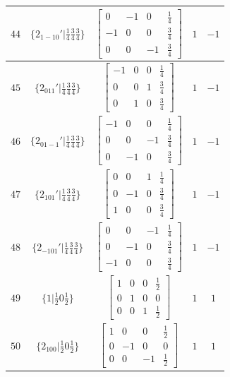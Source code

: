 \documentclass[fleqn,8pt]{jsarticle}
\begin{document}
\begin{longtable}{ccccc}
$ 44 $ & $ \{2{}_{1-10}{}'|\frac{1}{4} \frac{3}{4} \frac{3}{4}\} $ & $ \begin{bmatrix} 0 & -1 & 0 & \frac{1}{4} \\ -1 & 0 & 0 & \frac{3}{4} \\ 0 & 0 & -1 & \frac{3}{4} \end{bmatrix} $ & $ 1 $ & $ -1 $ \\ \hline
$ 45 $ & $ \{2{}_{011}{}'|\frac{1}{4} \frac{3}{4} \frac{3}{4}\} $ & $ \begin{bmatrix} -1 & 0 & 0 & \frac{1}{4} \\ 0 & 0 & 1 & \frac{3}{4} \\ 0 & 1 & 0 & \frac{3}{4} \end{bmatrix} $ & $ 1 $ & $ -1 $ \\ \hline
$ 46 $ & $ \{2{}_{01-1}{}'|\frac{1}{4} \frac{3}{4} \frac{3}{4}\} $ & $ \begin{bmatrix} -1 & 0 & 0 & \frac{1}{4} \\ 0 & 0 & -1 & \frac{3}{4} \\ 0 & -1 & 0 & \frac{3}{4} \end{bmatrix} $ & $ 1 $ & $ -1 $ \\ \hline
$ 47 $ & $ \{2{}_{101}{}'|\frac{1}{4} \frac{3}{4} \frac{3}{4}\} $ & $ \begin{bmatrix} 0 & 0 & 1 & \frac{1}{4} \\ 0 & -1 & 0 & \frac{3}{4} \\ 1 & 0 & 0 & \frac{3}{4} \end{bmatrix} $ & $ 1 $ & $ -1 $ \\ \hline
$ 48 $ & $ \{2{}_{-101}{}'|\frac{1}{4} \frac{3}{4} \frac{3}{4}\} $ & $ \begin{bmatrix} 0 & 0 & -1 & \frac{1}{4} \\ 0 & -1 & 0 & \frac{3}{4} \\ -1 & 0 & 0 & \frac{3}{4} \end{bmatrix} $ & $ 1 $ & $ -1 $ \\ \hline
$ 49 $ & $ \{1|\frac{1}{2} 0 \frac{1}{2}\} $ & $ \begin{bmatrix} 1 & 0 & 0 & \frac{1}{2} \\ 0 & 1 & 0 & 0 \\ 0 & 0 & 1 & \frac{1}{2} \end{bmatrix} $ & $ 1 $ & $ 1 $ \\ \hline
$ 50 $ & $ \{2{}_{100}|\frac{1}{2} 0 \frac{1}{2}\} $ & $ \begin{bmatrix} 1 & 0 & 0 & \frac{1}{2} \\ 0 & -1 & 0 & 0 \\ 0 & 0 & -1 & \frac{1}{2} \end{bmatrix} $ & $ 1 $ & $ 1 $ \\ \hline

\end{longtable}
\end{document}
